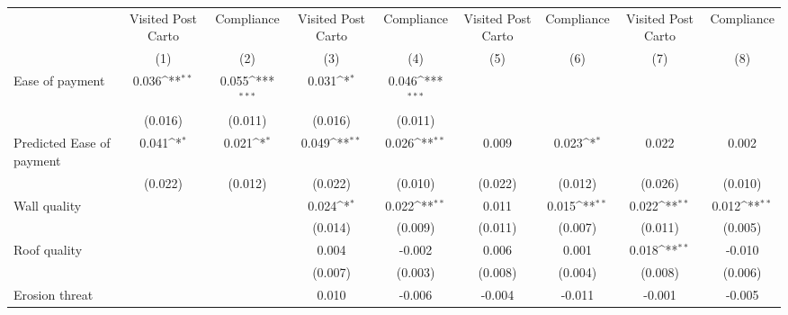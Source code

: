 {
\def\sym#1{\ifmmode^{#1}\else\(^{#1}\)\fi}
\begin{tabular}{l*{8}{c}}
\toprule
                &\multicolumn{1}{c}{Visited Post Carto}&\multicolumn{1}{c}{Compliance}&\multicolumn{1}{c}{Visited Post Carto}&\multicolumn{1}{c}{Compliance}&\multicolumn{1}{c}{Visited Post Carto}&\multicolumn{1}{c}{Compliance}&\multicolumn{1}{c}{Visited Post Carto}&\multicolumn{1}{c}{Compliance}\\
                &\multicolumn{1}{c}{(1)}         &\multicolumn{1}{c}{(2)}         &\multicolumn{1}{c}{(3)}         &\multicolumn{1}{c}{(4)}         &\multicolumn{1}{c}{(5)}         &\multicolumn{1}{c}{(6)}         &\multicolumn{1}{c}{(7)}         &\multicolumn{1}{c}{(8)}         \\
\midrule
Ease of payment &    0.036\sym{**} &    0.055\sym{***}&    0.031\sym{*}  &    0.046\sym{***}&                  &                  &                  &                  \\
                &  (0.016)         &  (0.011)         &  (0.016)         &  (0.011)         &                  &                  &                  &                  \\
Predicted Ease of payment&    0.041\sym{*}  &    0.021\sym{*}  &    0.049\sym{**} &    0.026\sym{**} &    0.009         &    0.023\sym{*}  &    0.022         &    0.002         \\
                &  (0.022)         &  (0.012)         &  (0.022)         &  (0.010)         &  (0.022)         &  (0.012)         &  (0.026)         &  (0.010)         \\
Wall quality    &                  &                  &    0.024\sym{*}  &    0.022\sym{**} &    0.011         &    0.015\sym{**} &    0.022\sym{**} &    0.012\sym{**} \\
                &                  &                  &  (0.014)         &  (0.009)         &  (0.011)         &  (0.007)         &  (0.011)         &  (0.005)         \\
Roof quality    &                  &                  &    0.004         &   -0.002         &    0.006         &    0.001         &    0.018\sym{**} &   -0.010         \\
                &                  &                  &  (0.007)         &  (0.003)         &  (0.008)         &  (0.004)         &  (0.008)         &  (0.006)         \\
Erosion threat  &                  &                  &    0.010         &   -0.006         &   -0.004         &   -0.011         &   -0.001         &   -0.005         \\

\end{tabular}}
